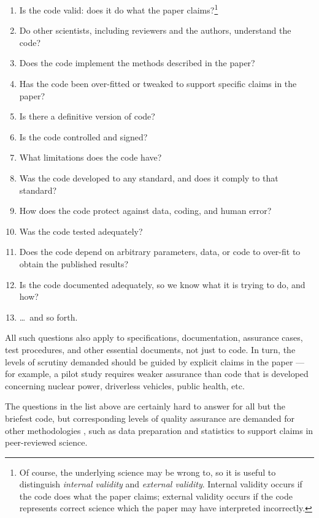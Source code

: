\documentclass{comjnl}
\begin{document}
\newcount \enum
{}
\renewcommand{\theenumi}{\ifnum \enum<10 \hphantom{0}\fi
\the\enum
\global\advance \enum by 1}
\begin{enumerate}\raggedright
\item Is the code valid: does it do what the paper claims?\footnote{Of course, the underlying science may be wrong to, so it is useful to distinguish \emph{internal validity\/} and \emph{external validity}. Internal validity occurs if the code does what the paper claims; external validity occurs if the code represents correct science which the paper may have interpreted incorrectly.}
\item Do other scientists, including reviewers and the authors, understand the code?
\item Does the code implement the methods described in the paper?
\item Has the code been over-fitted or tweaked to support specific claims in the paper?
\item Is there a definitive version of code?
\item Is the code controlled and signed?
\item What limitations does the code have?
\item Was the code developed to any standard, and does it comply to that standard?
\item How does the code protect against data, coding, and human error?
\item Was the code tested adequately?
\item Does the code depend on arbitrary parameters, data, or code to over-fit to obtain the published results?
\item Is the code documented adequately, so we know what it is trying to do, and how?
\item \ldots\ and so forth. 
\end{enumerate}

All such questions also apply to specifications, documentation, assurance cases, test procedures, and other essential documents, not just to code. In turn, the levels of scrutiny demanded should be guided by explicit claims in the paper \cite{essence-of-software} --- for example, a pilot study requires weaker assurance than code that is developed concerning nuclear power, driverless vehicles, public health, etc. 

The questions in the list above are certainly hard to answer for all but the briefest code, but corresponding levels of quality assurance are demanded for other methodologies \cite{notebooks,popper-conjectures-refutations,tripod,prisma,nih-policy,nih-nature}, such as data preparation and statistics to support claims in peer-reviewed science. 
\end{document}
